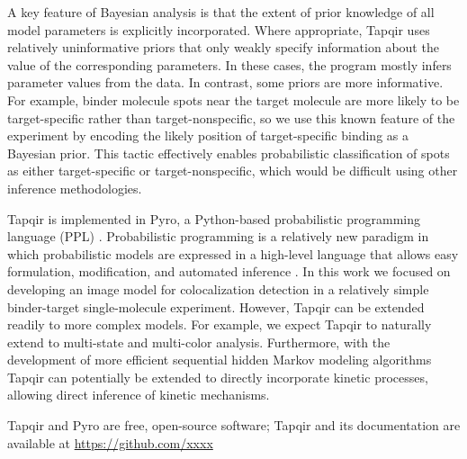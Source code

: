 A key feature of Bayesian analysis is that the extent of prior knowledge of all model parameters is explicitly incorporated. Where appropriate, Tapqir uses relatively uninformative priors that only weakly specify information about the value of the corresponding parameters.  In these cases, the program mostly infers parameter values from the data.  In contrast, some priors are more informative.  For example, binder molecule spots near the target molecule are more likely to be target-specific rather than target-nonspecific, so we use this known feature of the experiment by encoding the likely position of target-specific binding as a Bayesian prior. This tactic effectively enables probabilistic classification of spots as either target-specific or target-nonspecific, which would be difficult using other inference methodologies.

Tapqir is implemented in Pyro, a Python-based probabilistic programming language (PPL) \citep{Bingham2019-qy}. Probabilistic programming is a relatively new paradigm in which probabilistic models are expressed in a high-level language that allows easy formulation, modification, and automated inference \citep{Van_de_Meent2018-mi}. In this work we focused on developing an image model for colocalization detection in a relatively simple binder-target single-molecule experiment. However, Tapqir can be extended readily to more complex models. For example, we expect Tapqir to naturally extend to multi-state and multi-color analysis. Furthermore, with the development of more efficient sequential hidden Markov modeling algorithms \citep{Sarkka2019-jw,Obermeyer2019-pp} Tapqir can potentially be extended to directly incorporate kinetic processes, allowing direct inference of kinetic mechanisms.

Tapqir and Pyro are free, open-source software; Tapqir and its documentation are available at \url{https://github.com/xxxx}
